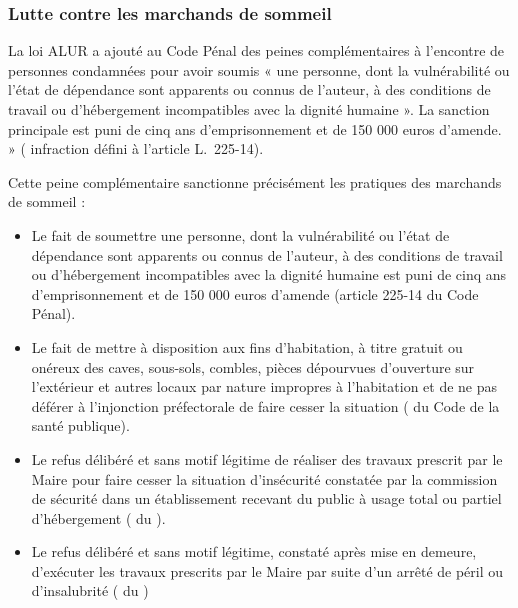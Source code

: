 		\subsubsection{Lutte contre les marchands de sommeil}
		
			La loi ALUR a ajouté au Code Pénal des peines complémentaires à l’encontre de personnes condamnées
			pour avoir soumis « une personne, dont la vulnérabilité ou l'état de dépendance sont apparents ou connus
			de l'auteur, à des conditions de travail ou d'hébergement incompatibles avec la dignité humaine ». La
			sanction principale est puni de cinq ans d'emprisonnement et de 150 000 euros d'amende. » ( infraction
			défini à l’article L.~225-14).
			
			Cette peine complémentaire sanctionne précisément les pratiques des marchands de sommeil :
			\begin{itemize}
				\item Le fait de soumettre une personne, dont la vulnérabilité ou l'état de dépendance sont apparents
				ou connus de l'auteur, à des conditions de travail ou d'hébergement incompatibles avec la
				dignité humaine est puni de cinq ans d'emprisonnement et de 150 000 euros d'amende (article
				225-14 du Code Pénal).
				
				\item  Le fait de mettre à disposition aux fins d'habitation, à titre gratuit ou onéreux des caves, sous-sols,
				combles, pièces dépourvues d'ouverture sur l'extérieur et autres locaux par nature impropres à
				l'habitation et de ne pas déférer à l’injonction préfectorale de faire cesser la situation ( du	Code de la santé publique).
				
				\item  Le refus délibéré et sans motif légitime de réaliser des travaux prescrit par le Maire pour faire
				cesser la situation d'insécurité constatée par la commission de sécurité dans un établissement
				recevant du public à usage total ou partiel d'hébergement ( du \CCH).
			
				\item  Le refus délibéré et sans motif légitime, constaté après mise en demeure, d'exécuter les travaux
				prescrits par le Maire par suite d’un arrêté de péril ou d’insalubrité ( du \CCH)
			\end{itemize}
			
